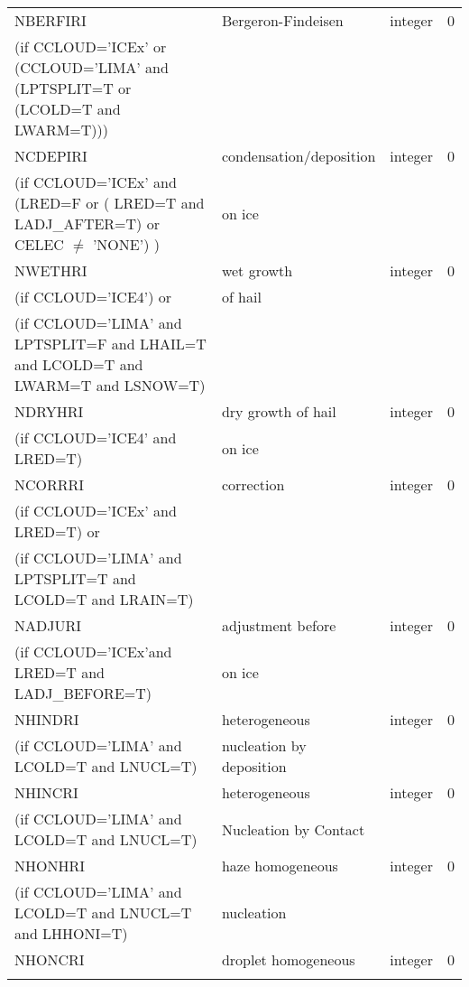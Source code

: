\begin{longtable} {|p{}|p{}|>{\centering}p{}|p{}<{\centering}|}
NBERFIRI&   Bergeron-Findeisen & integer  &  0 \index{NBERFIRI!\innam{NAM\_BU\_RRI}}\\ \nopagebreak
(if CCLOUD='ICEx' or (CCLOUD='LIMA' and (LPTSPLIT=T or (LCOLD=T and LWARM=T))) & &   &  \\\hline
NCDEPIRI&   condensation/deposition & integer  &  0 \index{NCDEPIRI!\innam{NAM\_BU\_RRI}}\\ \nopagebreak
(if CCLOUD='ICEx' and (LRED=F or ( LRED=T and LADJ\_AFTER=T) or CELEC $\neq$ 'NONE')  ) &  on ice&   &  \\\hline
NWETHRI &   wet growth  & integer  &  0 \index{NWETHRI!\innam{NAM\_BU\_RRI}}\\ \nopagebreak
(if CCLOUD='ICE4') or &of hail &   &  \\
(if CCLOUD='LIMA' and LPTSPLIT=F and LHAIL=T and LCOLD=T and LWARM=T and LSNOW=T) & &   &  \\\hline
NDRYHRI&    dry growth of hail& integer  &  0 \index{NDRYHRI!\innam{NAM\_BU\_RRI}}\\ \nopagebreak
(if CCLOUD='ICE4' and LRED=T) &  on ice&   &  \\\hline
NCORRRI&   correction & integer  &  0 \index{NCORRRI!\innam{NAM\_BU\_RRI}}\\ \nopagebreak
(if CCLOUD='ICEx' and LRED=T) or & &   &  \\ \nopagebreak
(if CCLOUD='LIMA' and LPTSPLIT=T and LCOLD=T and LRAIN=T) & &   &  \\\hline
NADJURI&   adjustment before & integer  &  0 \index{NADJURI!\innam{NAM\_BU\_RRI}}\\ \nopagebreak
(if CCLOUD='ICEx'and LRED=T and LADJ\_BEFORE=T) &  on ice&   &  \\\hline
NHINDRI &  heterogeneous     & integer  &  0 \index{NHINDRI!\innam{NAM\_BU\_RRI}}\\ \nopagebreak
(if CCLOUD='LIMA' and LCOLD=T and LNUCL=T) &nucleation by deposition &   &  \\\hline
NHINCRI & heterogeneous     & integer  &  0 \index{NHINCRI!\innam{NAM\_BU\_RRI}}\\ \nopagebreak
(if CCLOUD='LIMA' and LCOLD=T and LNUCL=T)   & Nucleation by Contact  &       &   \\\hline
NHONHRI & haze homogeneous     & integer  &  0 \index{NHONHRI!\innam{NAM\_BU\_RRI}}\\ \nopagebreak
(if CCLOUD='LIMA' and LCOLD=T and LNUCL=T and LHHONI=T) & nucleation  &   &  \\\hline
NHONCRI & droplet homogeneous     & integer  &  0 \index{NHONCRI!\innam{NAM\_BU\_RRI}}\\ \nopagebreak

\end{longtable}
